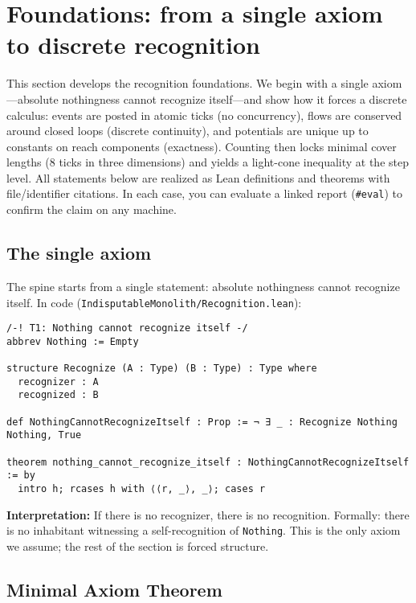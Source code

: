 \documentclass[11pt,a4paper,twoside]{article}
\numberwithin{equation}{section}
\theoremstyle{customthm}
\theoremstyle{customdef}
\theoremstyle{customrem}
\begin{document}
\section{Foundations: from a single axiom to discrete recognition}\label{sec:foundations}

This section develops the recognition foundations. We begin with a single axiom—absolute nothingness cannot recognize itself—and show how it forces a discrete calculus: events are posted in atomic ticks (no concurrency), flows are conserved around closed loops (discrete continuity), and potentials are unique up to constants on reach components (exactness). Counting then locks minimal cover lengths (8 ticks in three dimensions) and yields a light-cone inequality at the step level. All statements below are realized as Lean definitions and theorems with file/identifier citations. In each case, you can evaluate a linked report (\texttt{\#eval}) to confirm the claim on any machine.

\subsection{The single axiom}

\noindent The spine starts from a single statement: absolute nothingness cannot recognize itself. In code (\texttt{IndisputableMonolith/Recognition.lean}):

\begin{lstlisting}
/-! T1: Nothing cannot recognize itself -/
abbrev Nothing := Empty

structure Recognize (A : Type) (B : Type) : Type where
  recognizer : A
  recognized : B

def NothingCannotRecognizeItself : Prop := ¬ ∃ _ : Recognize Nothing Nothing, True

theorem nothing_cannot_recognize_itself : NothingCannotRecognizeItself := by
  intro h; rcases h with ⟨⟨r, _⟩, _⟩; cases r
\end{lstlisting}

\noindent\textbf{Interpretation:} If there is no recognizer, there is no recognition. Formally: there is no inhabitant witnessing a self-recognition of \texttt{Nothing}. This is the only axiom we assume; the rest of the section is forced structure.

\subsection{Minimal Axiom Theorem}
\end{document}
